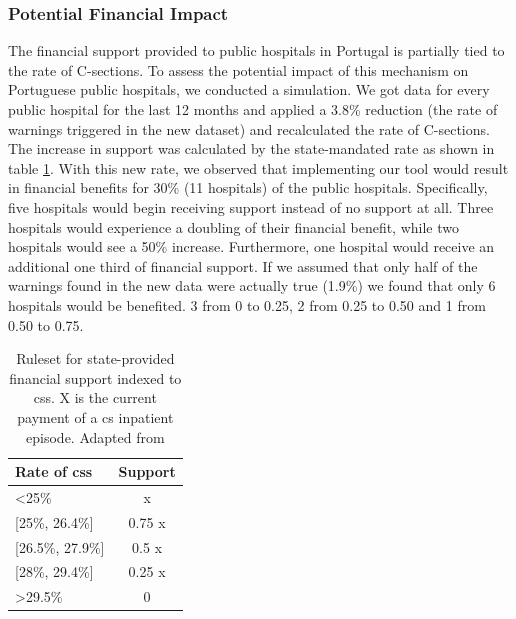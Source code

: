 \subsubsection{Potential Financial Impact}
The financial support provided to public hospitals in Portugal is partially tied to the rate of C-sections. To assess the potential impact of this mechanism on Portuguese public hospitals, we conducted a simulation. We got data for every public hospital for the last 12 months and applied a 3.8\% reduction (the rate of warnings triggered in the new dataset) and recalculated the rate of C-sections. The increase in support was calculated by the state-mandated rate as shown in table \ref{tab:corrections}. With this new rate, we observed that implementing our tool would result in financial benefits for 30\% (11 hospitals) of the public hospitals. Specifically, five hospitals would begin receiving support instead of no support at all. Three hospitals would experience a doubling of their financial benefit, while two hospitals would see a 50\% increase. Furthermore, one hospital would receive an additional one third of financial support. If we assumed that only half of the warnings found in the new data were actually true (1.9\%) we found that only 6 hospitals would be benefited. 3 from 0 to 0.25, 2 from 0.25 to 0.50 and 1 from 0.50 to 0.75.


\begin{table}[htbp]
  \centering
  \caption[Ruleset for financial support indexed to \acsp{cs}.]{Ruleset for state-provided financial support indexed to \acp{cs}. X is the current payment of a \ac{cs} inpatient episode. Adapted from \cite{acssTermosReferenciaPara2023}}
  \label{tab:corrections}
  \renewcommand{\arraystretch}{1.2} %
  \setlength{\tabcolsep}{12pt} %
  \begin{tabular}{lc}
      \hline
Rate of \acp{cs}   & Support \\
    \hline
\textless 25\%       & x       \\
{[}25\%, 26.4\%{]}   & 0.75 x   \\
{[}26.5\%, 27.9\%{]} & 0.5 x    \\
{[}28\%, 29.4\%{]}   & 0.25 x   \\
\textgreater{}29.5\% & 0      \\
    \hline
\end{tabular}
\end{table}